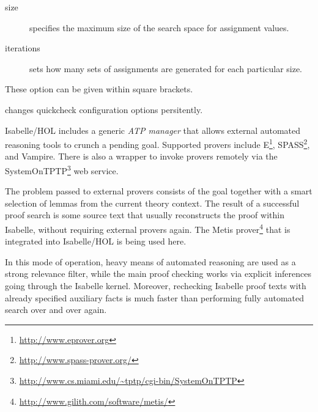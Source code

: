 \begin{isabellebody}
\begin{isamarkuptext}
\begin{description}
    \begin{description}

      \item[size] specifies the maximum size of the search space for
        assignment values.

      \item[iterations] sets how many sets of assignments are
        generated for each particular size.

    \end{description}

    These option can be given within square brackets.

  \item \hyperlink{command.HOL.quickcheck-params}{\mbox{}} changes quickcheck
    configuration options persitently.

  \end{description}%
\end{isamarkuptext}%
\isamarkuptrue%
%
\isamarkuptrue%
%
\begin{isamarkuptext}%
Isabelle/HOL includes a generic \emph{ATP manager} that allows
  external automated reasoning tools to crunch a pending goal.
  Supported provers include E\footnote{\url{http://www.eprover.org}},
  SPASS\footnote{\url{http://www.spass-prover.org/}}, and Vampire.
  There is also a wrapper to invoke provers remotely via the
  SystemOnTPTP\footnote{\url{http://www.cs.miami.edu/~tptp/cgi-bin/SystemOnTPTP}}
  web service.

  The problem passed to external provers consists of the goal together
  with a smart selection of lemmas from the current theory context.
  The result of a successful proof search is some source text that
  usually reconstructs the proof within Isabelle, without requiring
  external provers again.  The Metis
  prover\footnote{\url{http://www.gilith.com/software/metis/}} that is
  integrated into Isabelle/HOL is being used here.

  In this mode of operation, heavy means of automated reasoning are
  used as a strong relevance filter, while the main proof checking
  works via explicit inferences going through the Isabelle kernel.
  Moreover, rechecking Isabelle proof texts with already specified
  auxiliary facts is much faster than performing fully automated
  search over and over again.


\end{isamarkuptext}
\end{isabellebody}
